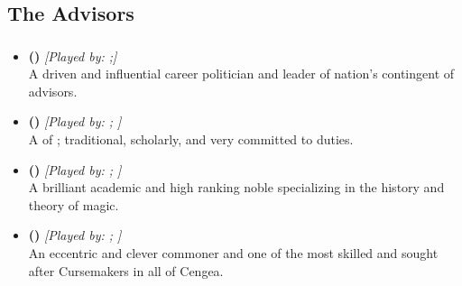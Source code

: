 \documentclass[blue]{GL2020}
\begin{document}
\name{\bDramatisPersonae{}}

\subsection*{The Advisors}
\subsubsection*{\pFarm{}}
\begin{itemize}
    \item \textbf{\cEvil{\full} (\cEvil{\MYcharpronouns})} \textit{[Played by: \cEvil{\MYplayer};\cEvil{\MYplayerpronouns}]}\\ A driven and influential career politician and leader of \cEvil{\their} nation's contingent of advisors.
    
    \item \textbf{\cHedonist{\full} (\cHedonist{\MYcharpronouns})} \textit{[Played by: \cHedonist{\MYplayer}; \cHedonist{\MYplayerpronouns}]}\\ A \cHedonist{\cleric} of \cFarmGod{}; traditional, scholarly, and very committed to \cHedonist{\their} duties.
    
    \item \textbf{\cWildCard{\full} (\cWildCard{\MYcharpronouns})} \textit{[Played by: \cWildCard{\MYplayer}; \cWildCard{\MYplayerpronouns}]}\\ A brilliant academic and high ranking noble specializing in the history and theory of magic.
    
    \item \textbf{\cCurse{\full} (\cCurse{\MYcharpronouns})} \textit{[Played by: \cCurse{\MYplayer}; \cCurse{\MYplayerpronouns}]}\\ An eccentric and clever commoner and one of the most skilled and sought after Cursemakers in all of Cengea.
\end{itemize}
\end{document}
